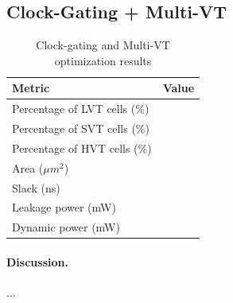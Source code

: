 \documentclass[11pt,a4paper]{article}
\begin{document}
\subsection{Clock-Gating + Multi-VT}

\begin{table}[h]
\centering
\caption{Clock-gating and Multi-VT optimization results}
\begin{tabular}{lc}
\toprule
\textbf{Metric} & \textbf{Value} \\
\midrule
Percentage of LVT cells (\%) &  \\
Percentage of SVT cells (\%) &  \\
Percentage of HVT cells (\%) &  \\
Area ($\mu m^2$) &  \\
Slack (ns) &  \\
Leakage power (mW) &  \\
Dynamic power (mW) &  \\
\bottomrule
\end{tabular}
\end{table}

\paragraph{Discussion.} ...
\end{document}
